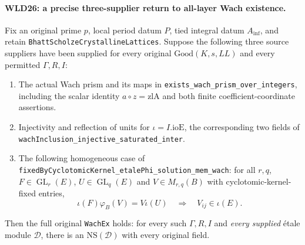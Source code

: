 \paragraph{WLD26: a precise three-supplier return to all-layer Wach existence.}
\label{claim:WLD26}
Fix an original prime $p$, local period datum $P$, tied integral
datum $A_{\inf}$, and retain
\texttt{Bhatt\allowbreak Scholze\allowbreak Crystalline\allowbreak Lattices}. Suppose the following
three source suppliers have been supplied for every original
$\mathrm{Good}(K,s,LL)$ and every permitted $\Gamma,R,I$:
\begin{enumerate}
 \item The actual Wach prism and its maps in
 \texttt{exists\_\allowbreak wach\_\allowbreak prism\_\allowbreak over\_\allowbreak integers}, including the
 scalar identity $a\circ z=\mathrm{zlA}$ and both finite
 coefficient-coordinate assertions.
 \item Injectivity and reflection of units for
 $\iota=I.\mathrm{ioE}$, the corresponding two fields of
 \texttt{wach\allowbreak Inclusion\_\allowbreak injective\_\allowbreak saturated\_\allowbreak inter}.
 \item The following homogeneous case of
 \texttt{fixed\allowbreak By\allowbreak Cyclotomic\allowbreak Kernel\_\allowbreak etale\allowbreak Phi\_\allowbreak solution\_\allowbreak mem\_\allowbreak wach}:
 for all $r,q$, $F\in\operatorname{GL}_r(E)$,
 $U\in\operatorname{GL}_q(E)$ and $V\in M_{r,q}(B)$ with
 cyclotomic-kernel-fixed entries,
 \[
                 \iota(F)\varphi_B(V)=V\iota(U)
                     \quad\Longrightarrow\quad V_{ij}\in\iota(E).
 \]
\end{enumerate}
Then the full original \texttt{Wach\allowbreak Ex} holds: for every such
$\Gamma,R,I$ and \emph{every supplied} \'etale module $\mathcal D$,
there is an $\mathrm{NS}(\mathcal D)$ with every original field.

